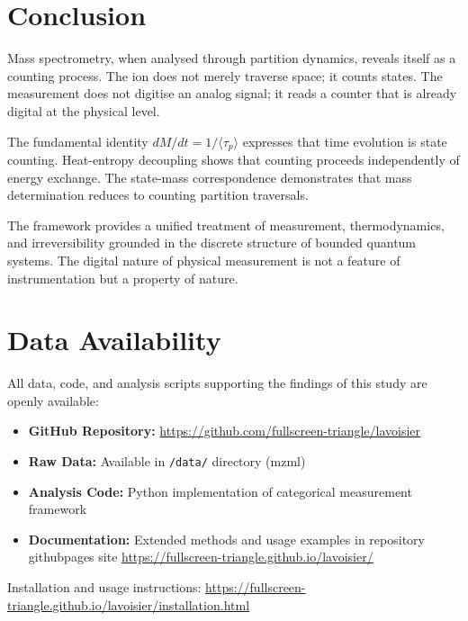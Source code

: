 \documentclass[twocolumn,10pt]{article}
\begin{document}
\section{Conclusion}
\label{sec:conclusion}

Mass spectrometry, when analysed through partition dynamics, reveals itself as a counting process. The ion does not merely traverse space; it counts states. The measurement does not digitise an analog signal; it reads a counter that is already digital at the physical level.

The fundamental identity $dM/dt = 1/\langle\tau_p\rangle$ expresses that time evolution is state counting. Heat-entropy decoupling shows that counting proceeds independently of energy exchange. The state-mass correspondence demonstrates that mass determination reduces to counting partition traversals.

The framework provides a unified treatment of measurement, thermodynamics, and irreversibility grounded in the discrete structure of bounded quantum systems. The digital nature of physical measurement is not a feature of instrumentation but a property of nature.

\section*{Data Availability}

All data, code, and analysis scripts supporting the findings of this study are openly available:

\begin{itemize}[noitemsep]
    \item \textbf{GitHub Repository:} \url{https://github.com/fullscreen-triangle/lavoisier}
    \item \textbf{Raw Data:} Available in \texttt{/data/} directory (mzml)
    \item \textbf{Analysis Code:} Python implementation of categorical measurement framework
    \item \textbf{Documentation:} Extended methods and usage examples in repository githubpages site \url{https://fullscreen-triangle.github.io/lavoisier/}
\end{itemize}

Installation and usage instructions: \url{https://fullscreen-triangle.github.io/lavoisier/installation.html}



\end{document}
